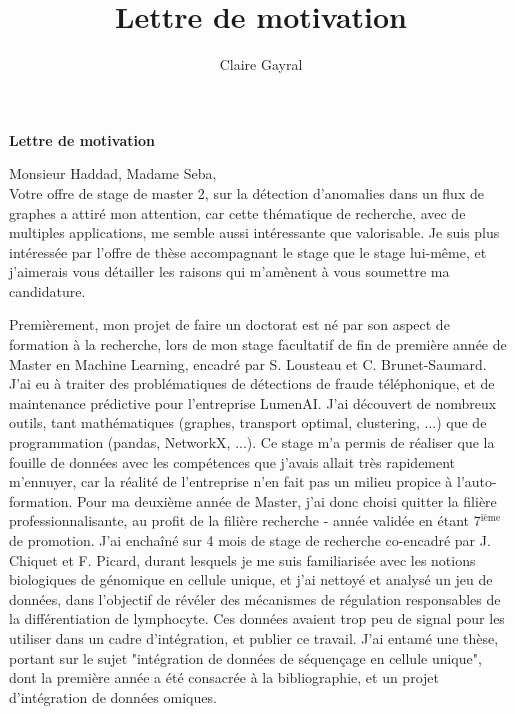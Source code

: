 \documentclass[a4paper,11pt]{article}
\title{Lettre de motivation}
\author{Claire Gayral}
\date{}
\begin{document}
{\centering \Large \bf Lettre de motivation \\ \vspace{0.6cm} }

Monsieur Haddad, Madame Seba,\\

Votre offre de stage de master 2, sur la détection d’anomalies dans un flux de graphes a attiré mon attention, car cette thématique de recherche, avec de multiples applications, me semble aussi intéressante que valorisable. Je suis plus intéressée par l'offre de thèse accompagnant le stage que le stage lui-même, et j'aimerais vous détailler les raisons qui m'amènent à vous soumettre ma candidature.

Premièrement, mon projet de faire un doctorat est né par son aspect de formation à la recherche, lors de mon stage facultatif de fin de première année de Master en Machine Learning, encadré par S. Lousteau et C. Brunet-Saumard.
J'ai eu à traiter des problématiques de détections de fraude téléphonique, et de maintenance prédictive pour l'entreprise LumenAI. J'ai découvert de nombreux outils, tant mathématiques (graphes, transport optimal, clustering, ...) que de programmation (pandas, NetworkX, ...). 
Ce stage m'a permis de réaliser que la fouille de données avec les compétences que j'avais allait très rapidement m'ennuyer, car la réalité de l'entreprise n'en fait pas un milieu propice à l'auto-formation. 
Pour ma deuxième année de Master, j'ai donc choisi quitter la filière professionnalisante, au profit de la filière recherche - année validée en étant 7$^{\text{ième}}$ de promotion. 
J'ai enchaîné sur 4 mois de stage de recherche co-encadré par J. Chiquet et F. Picard, durant lesquels je me suis familiarisée avec les notions biologiques de génomique en cellule unique, et j'ai nettoyé et analysé un jeu de données, dans l'objectif de révéler des mécanismes de régulation responsables de la différentiation de lymphocyte. Ces données avaient trop peu de signal pour les utiliser dans un cadre d'intégration, et publier ce travail. J'ai entamé une thèse, portant sur le sujet "intégration de données de séquençage en cellule unique", dont la première année a été consacrée à la bibliographie, et un projet d'intégration de données omiques. %
\end{document}

